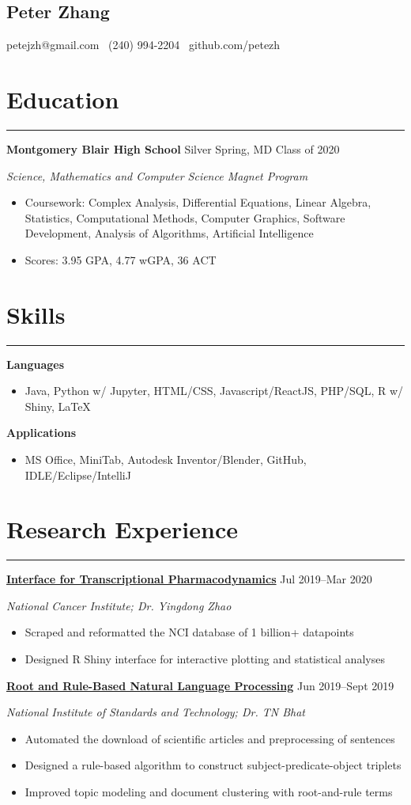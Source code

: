 \documentclass[11pt]{article}
\newcommand{\name}[1]{\begin{center}\section*{\huge \color{highlight} #1}\end{center}}
\newcommand{\topinfo}[1]{\begin{center}\vspace{-0.2cm}#1\vspace{-0.2cm}\end{center}}
\newcommand{\resumesection}[1]{\vspace{-0.3cm}\section*{\color{highlight}#1}\vspace{-0.3cm}\hrule\vspace{0.3cm}}
\begin{document}
\name{Peter Zhang}
\topinfo{petejzh@gmail.com \textbullet\ (240) 994-2204 \textbullet\ github.com/petezh}

\resumesection{Education}

\textbf{Montgomery Blair High School} Silver Spring, MD \hfill Class of 2020 \par
\textit{Science, Mathematics and Computer Science Magnet Program}

\begin{itemize}
	\item Coursework: Complex Analysis, Differential Equations, Linear Algebra, Statistics, Computational Methods, Computer Graphics, Software Development, Analysis of Algorithms, Artificial Intelligence
	\item Scores: 3.95 GPA, 4.77 wGPA, 36 ACT
\end{itemize}


\resumesection{Skills}

\textbf{Languages}
\begin{itemize} 
	\item Java, Python w/ Jupyter, HTML/CSS, Javascript/ReactJS, PHP/SQL, R w/ Shiny, \LaTeX
\end{itemize}\vspace{0.1cm}

\textbf{Applications}
\begin{itemize} 
	\item MS Office, MiniTab, Autodesk Inventor/Blender, GitHub, IDLE/Eclipse/IntelliJ
\end{itemize}

\resumesection{Research Experience}


\textbf{\href{https://github.com/petezh/TP-Workbench}{Interface for Transcriptional Pharmacodynamics}} \hfill Jul 2019--Mar 2020 \par
\textit{National Cancer Institute; Dr. Yingdong Zhao}
\begin{itemize}
	\item Scraped and reformatted the NCI database of 1 billion+ datapoints
	\item Designed R Shiny interface for interactive plotting and statistical analyses
\end{itemize}\vspace{0.1cm}

\textbf{\href{https://github.com/petezh/Root-and-Rule-NLP}{Root and Rule-Based Natural Language Processing}} \hfill Jun 2019--Sept 2019\par
\textit{National Institute of Standards and Technology; Dr. TN Bhat}
\begin{itemize}
	\item Automated the download of scientific articles and preprocessing of sentences
	\item Designed a rule-based algorithm to construct subject-predicate-object triplets
	\item Improved topic modeling and document clustering with root-and-rule terms
\end{itemize}\vspace{0.1cm}
\end{document}
